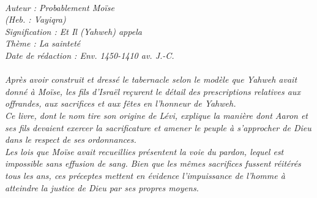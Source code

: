 \BFont
\noindent\hrulefill
{\footnotesize
\textit{
\bigskip
{\centering{}
\\Auteur : Probablement Moïse
\\(Heb. : Vayiqra)
\\Signification : Et Il (Yahweh) appela 
\\Thème : La sainteté
\\Date de rédaction : Env. 1450-1410 av. J.-C.\\}
}
\textit{
\\Après avoir construit et dressé le tabernacle selon le modèle que Yahweh avait donné à Moïse, les fils d’Israël reçurent le détail des prescriptions relatives aux offrandes, aux sacrifices et aux fêtes en l’honneur de Yahweh. 
\\Ce livre, dont le nom tire son origine de Lévi, explique la manière dont Aaron et ses fils devaient exercer la sacrificature et amener le peuple à s’approcher de Dieu dans le respect de ses ordonnances.
\\Les lois que Moïse avait recueillies présentent la voie du pardon, lequel est impossible sans effusion de sang. Bien que les mêmes sacrifices fussent réitérés tous les ans, ces préceptes mettent en évidence l’impuissance de l’homme à atteindre la justice de Dieu par ses propres moyens.\bigskip
}
}
\par\nobreak\noindent\hrulefill
